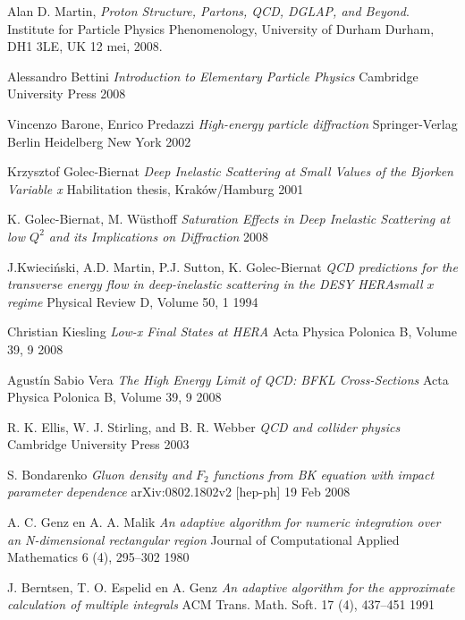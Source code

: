 \documentclass[a4paper,11pt]{article}
\numberwithin{equation}{section} %
\begin{document}
\newpage
\begin{thebibliography}{99}

  Alan D. Martin,
  \emph{Proton Structure, Partons, QCD, DGLAP, and Beyond}.
  Institute for Particle Physics Phenomenology,
  University of Durham
  Durham, DH1 3LE, UK
  12 mei, 2008.

  Alessandro Bettini
  \emph{Introduction to Elementary Particle Physics}
  Cambridge University Press
  2008

  Vincenzo Barone, Enrico Predazzi
  \emph{High-energy particle diffraction}
  Springer-Verlag Berlin Heidelberg New York
  2002

  Krzysztof Golec-Biernat
  \emph{Deep Inelastic Scattering at Small Values of the Bjorken Variable x}
  Habilitation thesis,
  Kraków/Hamburg
  2001

  K. Golec-Biernat, M. Wüsthoff
 \emph{ Saturation Effects in Deep Inelastic Scattering at low $Q^2$ and its Implications on Diffraction}
  2008
  
  J.Kwieciński, A.D. Martin, P.J. Sutton, K. Golec-Biernat
  \emph{QCD predictions for the transverse energy flow in deep-inelastic scattering in the DESY HERAsmall $x$ regime}
  Physical Review D, Volume 50, 1
  1994

  Christian Kiesling
  \emph{Low-x Final States at HERA}
  Acta Physica Polonica B, Volume 39, 9
  2008

  Agustín Sabio Vera
  \emph{The High Energy Limit of QCD: BFKL Cross-Sections}
  Acta Physica Polonica B, Volume 39, 9
  2008

  R. K. Ellis, W. J. Stirling, and B. R. Webber
  \emph{QCD and collider physics}
  Cambridge University Press
  2003

  S. Bondarenko
  \emph{Gluon density and $F_2$ functions from BK equation with impact parameter dependence}
  arXiv:0802.1802v2 [hep-ph]
  19 Feb 2008

  A. C. Genz en A. A. Malik
  \emph{An adaptive algorithm for numeric integration over an N-dimensional rectangular region}
  Journal of Computational Applied Mathematics 6 (4), 295–302
  1980

  J. Berntsen, T. O. Espelid en A. Genz
  \emph{An adaptive algorithm for the approximate calculation of multiple integrals}
  ACM Trans. Math. Soft. 17 (4), 437–451
  1991 

\end{thebibliography}
\end{document}
